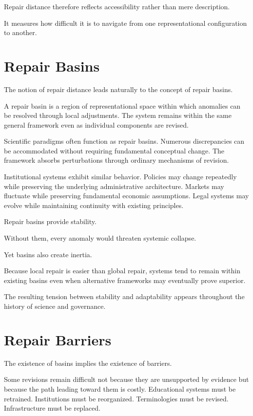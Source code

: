 \documentclass[11pt,oneside,openany]{book}
\begin{document}
Repair distance therefore reflects accessibility rather than mere description.

It measures how difficult it is to navigate from one representational configuration to another.

\section{Repair Basins}

The notion of repair distance leads naturally to the concept of repair basins.

A repair basin is a region of representational space within which anomalies can be resolved through local adjustments. The system remains within the same general framework even as individual components are revised.

Scientific paradigms often function as repair basins. Numerous discrepancies can be accommodated without requiring fundamental conceptual change. The framework absorbs perturbations through ordinary mechanisms of revision.

Institutional systems exhibit similar behavior. Policies may change repeatedly while preserving the underlying administrative architecture. Markets may fluctuate while preserving fundamental economic assumptions. Legal systems may evolve while maintaining continuity with existing principles.

Repair basins provide stability.

Without them, every anomaly would threaten systemic collapse.

Yet basins also create inertia.

Because local repair is easier than global repair, systems tend to remain within existing basins even when alternative frameworks may eventually prove superior.

The resulting tension between stability and adaptability appears throughout the history of science and governance.

\section{Repair Barriers}

The existence of basins implies the existence of barriers.

Some revisions remain difficult not because they are unsupported by evidence but because the path leading toward them is costly. Educational systems must be retrained. Institutions must be reorganized. Terminologies must be revised. Infrastructure must be replaced.
\end{document}
